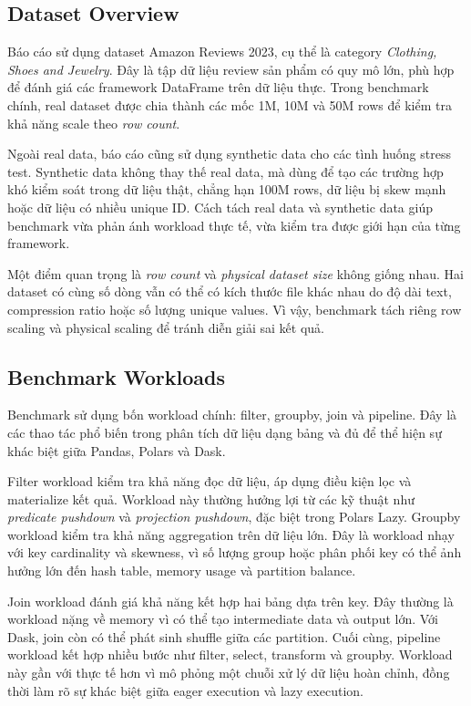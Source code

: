\documentclass[12pt,a4paper]{article}
\begin{document}
\subsection{Dataset Overview}

Báo cáo sử dụng dataset Amazon Reviews 2023, cụ thể là category \textit{Clothing, Shoes and Jewelry}. Đây là tập dữ liệu review sản phẩm có quy mô lớn, phù hợp để đánh giá các framework DataFrame trên dữ liệu thực. Trong benchmark chính, real dataset được chia thành các mốc 1M, 10M và 50M rows để kiểm tra khả năng scale theo \textit{row count}.

Ngoài real data, báo cáo cũng sử dụng synthetic data cho các tình huống stress test. Synthetic data không thay thế real data, mà dùng để tạo các trường hợp khó kiểm soát trong dữ liệu thật, chẳng hạn 100M rows, dữ liệu bị skew mạnh hoặc dữ liệu có nhiều unique ID. Cách tách real data và synthetic data giúp benchmark vừa phản ánh workload thực tế, vừa kiểm tra được giới hạn của từng framework.

Một điểm quan trọng là \textit{row count} và \textit{physical dataset size} không giống nhau. Hai dataset có cùng số dòng vẫn có thể có kích thước file khác nhau do độ dài text, compression ratio hoặc số lượng unique values. Vì vậy, benchmark tách riêng row scaling và physical scaling để tránh diễn giải sai kết quả.

\subsection{Benchmark Workloads}

Benchmark sử dụng bốn workload chính: filter, groupby, join và pipeline. Đây là các thao tác phổ biến trong phân tích dữ liệu dạng bảng và đủ để thể hiện sự khác biệt giữa Pandas, Polars và Dask.

Filter workload kiểm tra khả năng đọc dữ liệu, áp dụng điều kiện lọc và materialize kết quả. Workload này thường hưởng lợi từ các kỹ thuật như \textit{predicate pushdown} và \textit{projection pushdown}, đặc biệt trong Polars Lazy. Groupby workload kiểm tra khả năng aggregation trên dữ liệu lớn. Đây là workload nhạy với key cardinality và skewness, vì số lượng group hoặc phân phối key có thể ảnh hưởng lớn đến hash table, memory usage và partition balance.

Join workload đánh giá khả năng kết hợp hai bảng dựa trên key. Đây thường là workload nặng về memory vì có thể tạo intermediate data và output lớn. Với Dask, join còn có thể phát sinh shuffle giữa các partition. Cuối cùng, pipeline workload kết hợp nhiều bước như filter, select, transform và groupby. Workload này gần với thực tế hơn vì mô phỏng một chuỗi xử lý dữ liệu hoàn chỉnh, đồng thời làm rõ sự khác biệt giữa eager execution và lazy execution.
\end{document}
